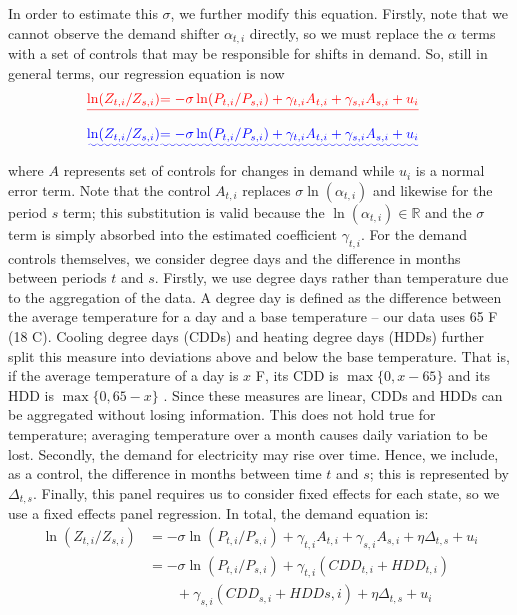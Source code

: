 \documentclass[11pt,a4paper,leqno]{extarticle}
\providecommand{\DIFadd}[1]{{\protect\color{blue}\uwave{#1}}} %
\providecommand{\DIFdel}[1]{{\protect\color{red}\sout{#1}}}                      %
\providecommand{\DIFaddbegin}{} %
\providecommand{\DIFaddend}{} %
\providecommand{\DIFdelbegin}{} %
\providecommand{\DIFdelend}{} %
\begin{document}
	In order to estimate this $\sigma$, we further modify this equation. 
	Firstly, note that we cannot observe the demand shifter $\alpha_{t,i}$ directly, so we must replace the $\alpha$ terms with a set of controls that may be responsible for shifts in demand. So, still in general terms, our regression equation is now
	\DIFdelbegin \begin{eqnarray*}
		\DIFdel{\ln (Z_{t, i} / Z_{ s, i}) }&\DIFdel{= -\sigma \ln (P_{t,i} / P_{s,i}) +  \gamma_{t,i} A_{t,i} + \gamma_{s,i} A_{s,i} + u_i
	}\end{eqnarray*}%
	\DIFdelend \DIFaddbegin \begin{align}
	\DIFadd{\ln (Z_{t, i} / Z_{ s, i}) }&\DIFadd{= -\sigma \ln (P_{t,i} / P_{s,i}) +  \gamma_{t,i} A_{t,i} + \gamma_{s,i} A_{s,i} + u_i
	}\end{align}\DIFaddend 
	where $A$ represents set of controls for changes in demand while $u_i$ is a normal error term. Note that the control  $A_{t,i}$ replaces $\sigma \ln(\alpha_{t,i})$ and likewise for the period $s$ term; this substitution is valid because the $\ln(\alpha_{t,i}) \in \mathbb{R}$ and the $\sigma$ term is simply absorbed into the estimated coefficient $\gamma_{t,i}$. For the demand controls themselves, we consider degree days and the difference in months between periods $t$ and $s$. Firstly, we use degree days rather than temperature due to the aggregation of the data. A degree day is defined as the difference between the average temperature for a day and a base temperature -- our data uses 65 \degree F (18 \degree C). Cooling degree days (CDDs) and heating degree days (HDDs) further split this measure into deviations above and below the base temperature. That is, if the average temperature of a day is $x$ \degree F, its CDD is $\max \{0, x-65\}$ and its HDD is $\max \{0, 65-x\}$ . Since these measures are linear, CDDs and HDDs can be aggregated without losing information. This does not hold true for temperature; averaging temperature over a month causes daily variation to be lost. Secondly, the demand for electricity may rise over time. Hence, we include, as a control, the difference in months between time $t$ and $s$; this is represented by $\Delta_{t,s}$. Finally, this panel requires us to consider fixed effects for each state, so we use a fixed effects panel regression. In total, the demand equation is:
	\begin{equation}
	\begin{split}
	\ln (Z_{ t, i} / Z_{ s, i}) &= -\sigma \ln (P_{t,i} / P_{s,i}) +  \gamma_{t,i} A_{t,i} + \gamma_{s,i} A_{s,i} + \eta \Delta_{t,s} + u_i \\
	&= -\sigma \ln (P_{t,i} / P_{s,i}) +  \gamma_{t,i} \left( CDD_{t,i} + HDD_{t,i} \right) \\
	&\qquad + \gamma_{s,i} \left( CDD_{s,i} + HDD{s,i} \right)  + \eta \Delta_{t,s} + u_i
	\end{split}
	\end{equation}
	
\end{document}

